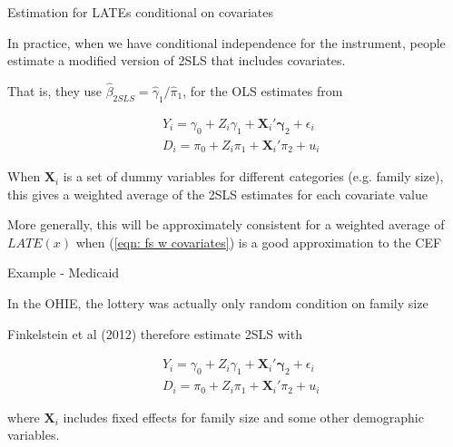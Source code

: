 \documentclass[11pt,english,handout]{beamer}
\newenvironment{wideitemize}{\itemize\addtolength{\itemsep}{10pt}}{\enditemize}
\begin{document}
\begin{frame}{Estimation for LATEs conditional on covariates}

\begin{wideitemize}
	\item
	In practice, when we have conditional independence for the instrument, people estimate a modified version of 2SLS that includes covariates.
	
	\item
	That is, they use $\hat\beta_{2SLS} = \hat\gamma_1 / \hat\pi_1$, for the OLS estimates from
	
		\begin{align}
		&Y_{i} = \gamma_0 +   Z_i \gamma_1 + \bm{X}_i' \bm{\gamma}_2 + \epsilon_{i} \label{eqn: rf w covariates}\\
		&D_i = \pi_0 + Z_i \pi_1 + \bm{X}_i'\pi_2 +  u_i \label{eqn: fs w covariates}
	\end{align}
	
	\pause 
	
	\item
	When $\bm{X}_i$ is a set of dummy variables for different categories (e.g. family size), this gives a weighted average of the 2SLS estimates for each covariate value
	
	\pause
	\item
	More generally, this will be approximately consistent for a weighted average of $LATE(x)$ when (\ref{eqn: fs w covariates}) is a good approximation to the CEF
	
\end{wideitemize}

\end{frame}


\begin{frame}{Example - Medicaid}
	\begin{wideitemize}
		\item
		In the OHIE, the lottery was actually only random condition on family size
		
		\pause
		\item
		Finkelstein et al (2012) therefore estimate 2SLS with 
		
			\begin{align}
			&Y_{i} = \gamma_0 +   Z_i \gamma_1 + \bm{X}_i' \bm{\gamma}_2 + \epsilon_{i} \\
			&D_i = \pi_0 + Z_i \pi_1 + \bm{X}_i'\pi_2 +  u_i 
		\end{align}
		
		\noindent where $\bm{X}_i$ includes fixed effects for family size and some other demographic variables. 
					
	\end{wideitemize}
\end{frame}
\end{document}
